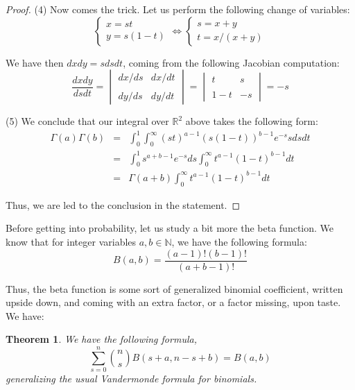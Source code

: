 \documentclass[12pt]{amsbook}
\newtheorem{theorem}{Theorem}[chapter]
\begin{document}
\begin{proof}
(4) Now comes the trick. Let us perform the following change of variables:
$$\begin{cases}x=st\\ y=s(1-t)\end{cases}\iff
\begin{cases}s=x+y\\ t=x/(x+y)\end{cases}$$ 

We have then $dxdy=sdsdt$, coming from the following Jacobian computation:
$$\frac{dxdy}{dsdt}
=\begin{vmatrix}dx/ds&dx/dt\\ \\ dy/ds&dy/dt\end{vmatrix}
=\begin{vmatrix}t&s\\ \\1-t&-s\end{vmatrix}=-s$$

(5) We conclude that our integral over $\mathbb R^2$ above takes the following form:
\begin{eqnarray*}
\Gamma(a)\Gamma(b)
&=&\int_0^1\int_0^\infty(st)^{a-1}(s(1-t))^{b-1}e^{-s}sdsdt\\
&=&\int_0^1s^{a+b-1}e^{-s}ds\int_0^\infty t^{a-1}(1-t)^{b-1}dt\\
&=&\Gamma(a+b)\int_0^\infty t^{a-1}(1-t)^{b-1}dt
\end{eqnarray*}

Thus, we are led to the conclusion in the statement.
\end{proof}

Before getting into probability, let us study a bit more the beta function. We know that for integer variables $a,b\in\mathbb N$, we have the following formula:
$$B(a,b)=\frac{(a-1)!(b-1)!}{(a+b-1)!}$$

Thus, the beta function is some sort of generalized binomial coefficient, written upside down, and coming with an extra factor, or a factor missing, upon taste. We have:


\begin{theorem}
We have the following formula,
$$\sum_{s=0}^n\binom{n}{s}B(s+a,n-s+b)=B(a,b)$$
generalizing the usual Vandermonde formula for binomials.
\end{theorem}
\end{document}

